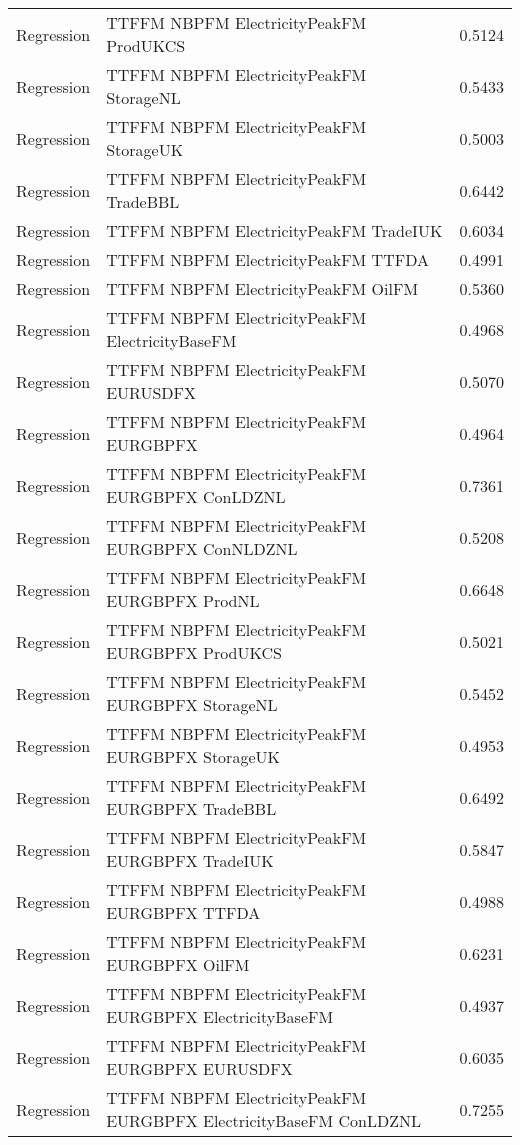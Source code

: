 \begin{table}[h!]
\begin{adjustbox}{max width=\textwidth}
\begin{tabular}{llr}
  Regression & TTFFM NBPFM ElectricityPeakFM ProdUKCS & 0.5124 \\ 
  Regression & TTFFM NBPFM ElectricityPeakFM StorageNL & 0.5433 \\ 
  Regression & TTFFM NBPFM ElectricityPeakFM StorageUK & 0.5003 \\ 
  Regression & TTFFM NBPFM ElectricityPeakFM TradeBBL & 0.6442 \\ 
  Regression & TTFFM NBPFM ElectricityPeakFM TradeIUK & 0.6034 \\ 
  Regression & TTFFM NBPFM ElectricityPeakFM TTFDA & 0.4991 \\ 
  Regression & TTFFM NBPFM ElectricityPeakFM OilFM & 0.5360 \\ 
  Regression & TTFFM NBPFM ElectricityPeakFM ElectricityBaseFM & 0.4968 \\ 
  Regression & TTFFM NBPFM ElectricityPeakFM EURUSDFX & 0.5070 \\ 
  Regression & TTFFM NBPFM ElectricityPeakFM EURGBPFX & 0.4964 \\ 
  Regression & TTFFM NBPFM ElectricityPeakFM EURGBPFX ConLDZNL & 0.7361 \\ 
  Regression & TTFFM NBPFM ElectricityPeakFM EURGBPFX ConNLDZNL & 0.5208 \\ 
  Regression & TTFFM NBPFM ElectricityPeakFM EURGBPFX ProdNL & 0.6648 \\ 
  Regression & TTFFM NBPFM ElectricityPeakFM EURGBPFX ProdUKCS & 0.5021 \\ 
  Regression & TTFFM NBPFM ElectricityPeakFM EURGBPFX StorageNL & 0.5452 \\ 
  Regression & TTFFM NBPFM ElectricityPeakFM EURGBPFX StorageUK & 0.4953 \\ 
  Regression & TTFFM NBPFM ElectricityPeakFM EURGBPFX TradeBBL & 0.6492 \\ 
  Regression & TTFFM NBPFM ElectricityPeakFM EURGBPFX TradeIUK & 0.5847 \\ 
  Regression & TTFFM NBPFM ElectricityPeakFM EURGBPFX TTFDA & 0.4988 \\ 
  Regression & TTFFM NBPFM ElectricityPeakFM EURGBPFX OilFM & 0.6231 \\ 
  Regression & TTFFM NBPFM ElectricityPeakFM EURGBPFX ElectricityBaseFM & 0.4937 \\ 
  Regression & TTFFM NBPFM ElectricityPeakFM EURGBPFX EURUSDFX & 0.6035 \\ 
  Regression & TTFFM NBPFM ElectricityPeakFM EURGBPFX ElectricityBaseFM ConLDZNL & 0.7255 \\ 

\end{tabular}
\end{adjustbox}
\end{table}
